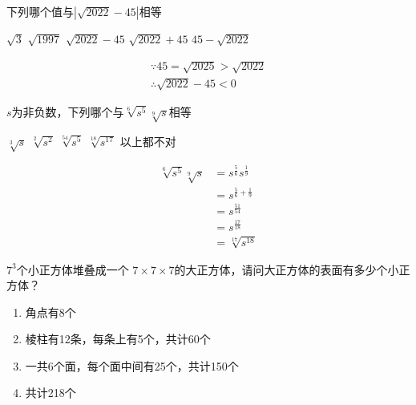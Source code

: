 \begin{questions}
	\question 下列哪个值与$|\sqrt{2022} - 45|$相等

	\begin{oneparchoices}
		\choice $\sqrt{3}$ \choice $\sqrt{1997}$ \choice $\sqrt{2022} - 45$ \choice $\sqrt{2022} + 45$ \CorrectChoice $45 - \sqrt{2022}$
	\end{oneparchoices}

	\begin{solution}
		\begin{gather*}
			\because 45 = \sqrt{2025} > \sqrt{2022} \\
			\therefore \sqrt{2022} - 45 < 0
		\end{gather*}
	\end{solution}

	\question $s$为非负数，下列哪个与$\sqrt[6]{s^5}\sqrt[9]{s}$相等

	\begin{oneparchoices}
		\choice $\sqrt[3]{s}$ \choice $\sqrt[2]{s^2}$ \choice $\sqrt[54]{s^5}$ \CorrectChoice $\sqrt[18]{s^{17}}$ \choice 以上都不对
	\end{oneparchoices}

	\begin{solution}
		\begin{align*}
			\sqrt[6]{s^5}\sqrt[9]{s} & = s^{\frac{5}{6}}s^{\frac{1}{9}} \\
			                         & = s^{\frac{5}{6} + \frac{1}{9}}  \\
			                         & = s^{\frac{51}{54}}              \\
			                         & = s^{\frac{17}{18}}              \\
			                         & = \sqrt[17]{s^{18}}
		\end{align*}
	\end{solution}

	\question \( 7^3 \)个小正方体堆叠成一个 \( 7 \times 7 \times 7 \)的大正方体，请问大正方体的表面有多少个小正方体？

	\begin{oneparchoices}
		    \choice 327
	\end{oneparchoices}

	\begin{solution}
		\begin{enumerate}
			\item 角点有8个
			\item 棱柱有12条，每条上有5个，共计60个
			\item 一共6个面，每个面中间有25个，共计150个
			\item 共计218个
		\end{enumerate}
	\end{solution}


\end{questions}
